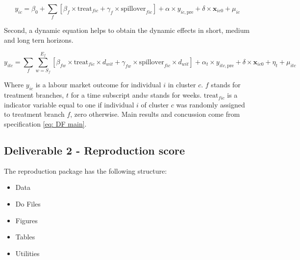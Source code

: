 \documentclass{article}
\begin{document}
    \begin{equation}
        y_{ic} = \beta_0 + \sum_{f}\left[\beta_f\times \text{treat}_{fic} + \gamma_f\times\text{spillover}_{fic}\right] +\alpha \times y_{ic,\text{pre}} + \delta\times \mathbf{x}_{ic0} + \mu_{ic} \label{eq: DF main}
    \end{equation}  
    
    \noindent Second, a dynamic equation helps to obtain the dynamic effects in short, medium and long tern horizons. 
    
    \begin{equation}
        y_{itc} = \sum_{f} \sum_{w=S_f}^{E_f}\left[\beta_{fw}\times\text{treat}_{fic}\times d_{wit}+\gamma_{fw}\times\text{spillover}_{fic}\times d_{wit}\right] + \alpha_t\times y_{itc,\text{pre}} + \delta\times\mathbf{x}_{ic0} + \eta_t + \mu_{itc} \label{eq:DF second}
    \end{equation}
    
    \noindent Where $y_{ic}$ is a labour market outcome for individual $i$ in cluster $c$. $f$ stands for treatment branches, $t$ for a time subscript and$w$ stands for weeks. $\text{treat}_{fic}$ is a indicator variable equal to one if individual $i$ of cluster $c$ was randomly assigned to treatment branch $f$, zero otherwise. Main results and concussion come from specification \ref{eq: DF main}. 
    
    \subsection{Deliverable 2 - Reproduction score} \label{DF Deliverable 2}
    
    The reproduction package has the following structure:

    \begin{itemize}
        \item Data
        \item Do Files
        \item Figures
        \item Tables
        \item Utilities
    \end{itemize}
    
\end{document}
